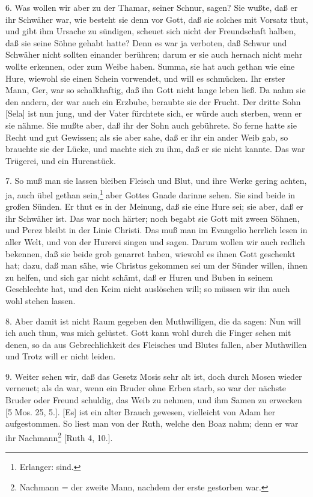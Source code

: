 6. Was wollen wir aber zu der Thamar, seiner Schnur, sagen? Sie wußte, daß er ihr Schwäher war, wie besteht sie denn vor Gott, daß sie solches mit Vorsatz thut, und gibt ihm
Ursache zu sündigen, scheuet sich nicht der Freundschaft halben, daß sie seine Söhne gehabt hatte? Denn es war ja verboten, daß Schwur und Schwäher nicht sollten einander berühren; darum er sie auch hernach nicht mehr wollte erkennen, oder zum Weibe haben. Summa, sie hat auch gethan wie eine Hure, wiewohl sie einen Schein vorwendet, und will es schmücken. Ihr erster Mann, Ger, war so schalkhaftig, daß ihn Gott nicht lange leben ließ. Da nahm sie den andern, der war auch ein Erzbube, beraubte sie der Frucht. Der dritte Sohn [Sela] ist nun jung, und der Vater fürchtete sich, er würde auch sterben, wenn er sie nähme. Sie mußte aber, daß ihr der Sohn auch gebührete. So ferne hatte sie Recht und gut Gewissen; als sie aber sahe, daß er ihr ein ander Weib gab, so brauchte sie der Lücke, und machte sich zu ihm, daß er sie nicht kannte. Das war Trügerei, und ein Hurenstück.

7. So muß man sie lassen bleiben Fleisch und Blut, und ihre Werke gering achten, ja, auch übel gethan sein,\footnote{Erlanger: sind.} aber Gottes Gnade darinne sehen. Sie sind beide in großen Sünden. Er thut es in der Meinung, daß sie eine Hure sei; sie aber, daß er ihr Schwäher ist. Das war noch härter; noch begabt sie Gott mit zween Söhnen, und Perez bleibt in der Linie Christi. Das muß man im Evangelio herrlich lesen in aller Welt, und von der Hurerei singen und sagen. Darum wollen wir auch redlich bekennen, daß sie beide grob genarret haben, wiewohl es ihnen Gott geschenkt hat; dazu, daß man sähe, wie Christus gekommen sei um der Sünder willen, ihnen zu helfen, und sich gar nicht schämt, daß er Huren und Buben in seinem Geschlechte hat, und den Keim nicht auslöschen will; so müssen wir ihn auch wohl stehen lassen.

8. Aber damit ist nicht Raum gegeben den Muthwilligen, die da sagen: Nun will ich auch thun, was mich gelüstet. Gott kann wohl durch die Finger sehen mit denen, so da aus Gebrechlichkeit des Fleisches und Blutes fallen, aber Muthwillen und Trotz will er nicht leiden.

9. Weiter sehen wir, daß das Gesetz Mosis sehr alt ist, doch durch Mosen wieder verneuet; als da war, wenn ein Bruder ohne Erben starb, so war der nächste Bruder oder Freund schuldig, das Weib zu nehmen, und ihm Samen zu erwecken [5 Mos. 25, 5.]. [Es] ist ein alter Brauch gewesen, vielleicht von Adam her aufgestommen. So liest man von der Ruth, welche den Boaz nahm; denn er war ihr Nachmann\footnote{Nachmann = der zweite Mann, nachdem der erste gestorben war.} [Ruth 4, 10.].

